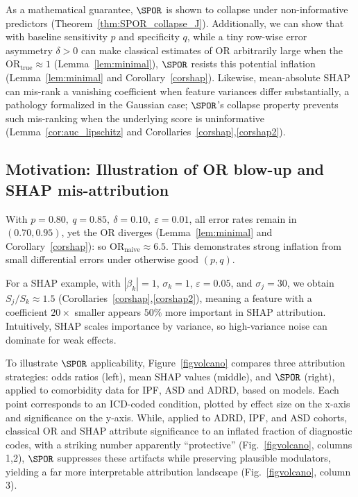 \documentclass[lineno]{biometrika}
\begin{document}
As a mathematical guarantee, $\SPOR$ is shown to collapse under non-informative predictors (Theorem~\ref{thm:SPOR_collapse_J}). Additionally, we can show that with baseline sensitivity $p$ and specificity $q$, while  a tiny row-wise error asymmetry $\delta>0$ can make classical estimates of  $\mathrm{OR}$  arbitrarily large when the  $\mathrm{OR}_{\text{true}}\approx 1$ (Lemma~\ref{lem:minimal}), $\SPOR$ resists  this potential  inflation  (Lemma~\ref{lem:minimal} and Corollary~\ref{corshap}). Likewise, mean-absolute SHAP can mis-rank a vanishing coefficient when feature variances differ substantially, a pathology formalized in the Gaussian case; $\SPOR$’s collapse property prevents such mis-ranking when the underlying score is uninformative (Lemma~\ref{cor:auc_lipschitz} and Corollaries~\ref{corshap},\ref{corshap2}).
   
\subsection{Motivation: Illustration of OR blow-up and SHAP mis-attribution}
With $p=0.80,\ q=0.85,\ \delta=0.10,\ \varepsilon=0.01$, all error rates remain in $(0.70,0.95)$, yet the OR diverges (Lemma~\ref{lem:minimal} and Corollary~\ref{corshap}):
so $\mathrm{OR}_{\text{naive}}\approx 6.5$.  
This demonstrates strong inflation from small differential errors
under otherwise good $(p,q)$.

For a SHAP example, with $|\beta_k| = 1$, $\sigma_k = 1$, $\varepsilon = 0.05$, and $\sigma_j = 30$, we obtain $S_j/S_k \approx 1.5$ (Corollaries~\ref{corshap},\ref{corshap2}), meaning a feature with a coefficient $20\times$ smaller appears $50\%$ more important in SHAP attribution. Intuitively, SHAP scales importance by variance, so high-variance noise can dominate  for weak effects.

To illustrate $\SPOR$ applicability, Figure~\ref{figvolcano} compares three attribution strategies:  odds ratios (left), mean SHAP values (middle), and $\SPOR$ (right), applied to comorbidity data for IPF, ASD and ADRD, based on \zcor models. Each point corresponds to an ICD-coded condition, plotted by effect size on the x-axis and significance on the y-axis. While, applied to ADRD, IPF, and ASD cohorts, classical OR and SHAP attribute significance to an inflated fraction of diagnostic codes, with a striking number apparently “protective” (Fig.~\ref{figvolcano}, columns 1,2), $\SPOR$ suppresses these artifacts while preserving  plausible modulators, yielding a far more interpretable attribution landscape (Fig.~\ref{figvolcano}, column 3). 
\end{document}
